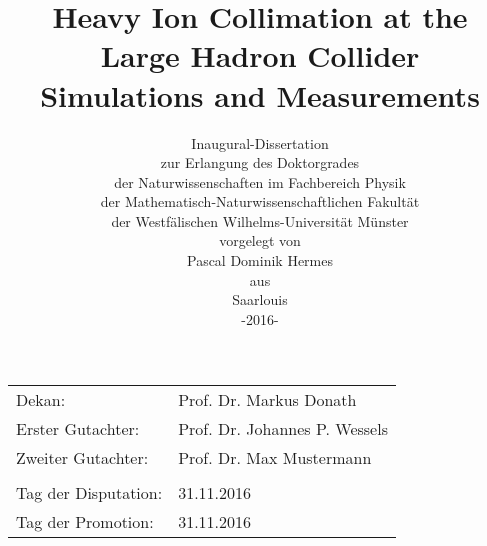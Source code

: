 \title{\huge{Heavy Ion Collimation at the Large Hadron Collider \\ Simulations and Measurements}}
\date{\vspace{1cm}  
\large{Inaugural-Dissertation}\\\vspace{0.1cm}zur Erlangung des Doktorgrades\\\vspace{0.1cm}der Naturwissenschaften im Fachbereich Physik\\\vspace{0.1cm}der Mathematisch-Naturwissenschaftlichen Fakult\"{a}t \\ \vspace{0.1cm} der Westf\"{a}lischen Wilhelms-Universit\"{a}t M\"{u}nster \\ \vspace{1cm} vorgelegt von \\ \vspace{0.1cm} Pascal Dominik Hermes \\ \vspace{0.1cm} aus \\  Saarlouis \\\vspace{1cm} \large{-2016-}}
\maketitle

\newpage
 \vspace*{\fill}
\begin{table}[htbp]
\begin{flushleft}
\begin{tabular}{ll}

Dekan: & Prof. Dr. Markus Donath \\ 
Erster Gutachter: & Prof. Dr. Johannes P. Wessels \\ 
Zweiter Gutachter: & Prof. Dr. Max Mustermann \\ 
 &  \\ 
Tag der Disputation: & 31.11.2016 \\ 
Tag der Promotion: & 31.11.2016 \\ 
\end{tabular}
\end{flushleft}
\end{table}




\thispagestyle{empty}
\clearpage\mbox{}\clearpage
\addtocounter{page}{-1}

\begin{titlepage}
\tableofcontents
\end{titlepage}

